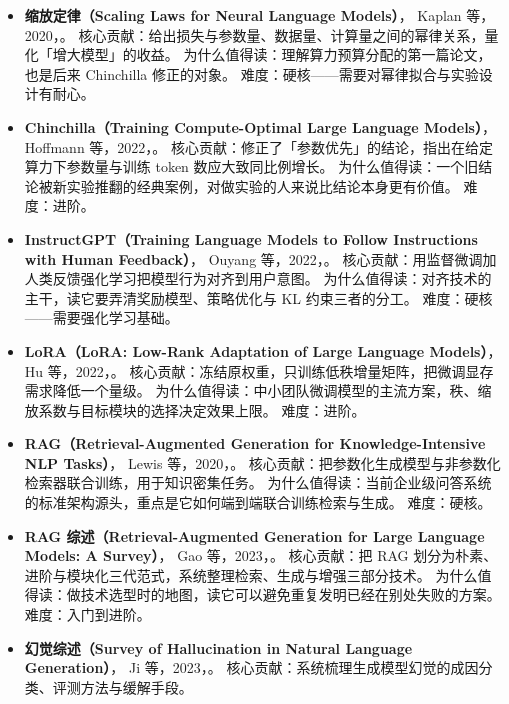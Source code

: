 \begin{itemize}
        为什么值得读：它的实验矩阵本身就是一份「如何做对照实验」的教材，值得模仿其消融设计。
        难度：进阶。
  \item \textbf{缩放定律（Scaling Laws for Neural Language Models）}，
        Kaplan 等，2020，\cite{kaplan2020scaling}。
        核心贡献：给出损失与参数量、数据量、计算量之间的幂律关系，量化「增大模型」的收益。
        为什么值得读：理解算力预算分配的第一篇论文，也是后来 Chinchilla 修正的对象。
        难度：硬核——需要对幂律拟合与实验设计有耐心。
  \item \textbf{Chinchilla（Training Compute-Optimal Large Language Models）}，
        Hoffmann 等，2022，\cite{hoffmann2022chinchilla}。
        核心贡献：修正了「参数优先」的结论，指出在给定算力下参数量与训练 token 数应大致同比例增长。
        为什么值得读：一个旧结论被新实验推翻的经典案例，对做实验的人来说比结论本身更有价值。
        难度：进阶。
  \item \textbf{InstructGPT（Training Language Models to Follow Instructions with Human Feedback）}，
        Ouyang 等，2022，\cite{ouyang2022instructgpt}。
        核心贡献：用监督微调加人类反馈强化学习把模型行为对齐到用户意图。
        为什么值得读：对齐技术的主干，读它要弄清奖励模型、策略优化与 KL 约束三者的分工。
        难度：硬核——需要强化学习基础。
  \item \textbf{LoRA（LoRA: Low-Rank Adaptation of Large Language Models）}，
        Hu 等，2022，\cite{hu2021lora}。
        核心贡献：冻结原权重，只训练低秩增量矩阵，把微调显存需求降低一个量级。
        为什么值得读：中小团队微调模型的主流方案，秩、缩放系数与目标模块的选择决定效果上限。
        难度：进阶。
  \item \textbf{RAG（Retrieval-Augmented Generation for Knowledge-Intensive NLP Tasks）}，
        Lewis 等，2020，\cite{lewis2021rag}。
        核心贡献：把参数化生成模型与非参数化检索器联合训练，用于知识密集任务。
        为什么值得读：当前企业级问答系统的标准架构源头，重点是它如何端到端联合训练检索与生成。
        难度：硬核。
  \item \textbf{RAG 综述（Retrieval-Augmented Generation for Large Language Models: A Survey）}，
        Gao 等，2023，\cite{gao2023ragsurvey}。
        核心贡献：把 RAG 划分为朴素、进阶与模块化三代范式，系统整理检索、生成与增强三部分技术。
        为什么值得读：做技术选型时的地图，读它可以避免重复发明已经在别处失败的方案。
        难度：入门到进阶。
  \item \textbf{幻觉综述（Survey of Hallucination in Natural Language Generation）}，
        Ji 等，2023，\cite{ji2023hallucination}。
        核心贡献：系统梳理生成模型幻觉的成因分类、评测方法与缓解手段。

\end{itemize}
